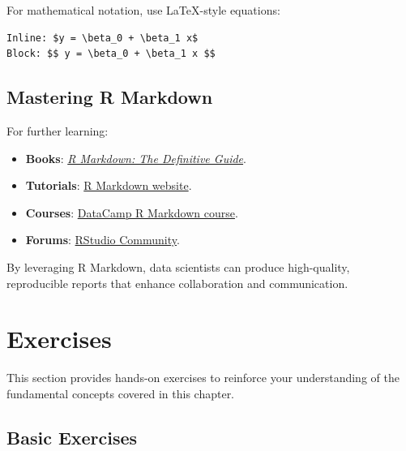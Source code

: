 \documentclass[
  11pt,
]{book}
\providecommand{\tightlist}{%
  \setlength{\itemsep}{0pt}\setlength{\parskip}{0pt}}
\theoremstyle{definition}
\theoremstyle{definition}
\theoremstyle{definition}
\theoremstyle{definition}
\theoremstyle{remark}
\begin{document}
For mathematical notation, use LaTeX-style equations:

\begin{lstlisting}
Inline: $y = \beta_0 + \beta_1 x$  
Block: $$ y = \beta_0 + \beta_1 x $$
\end{lstlisting}

\subsection*{Mastering R Markdown}\label{mastering-r-markdown}


For further learning:

\begin{itemize}
\tightlist
\item
  \textbf{Books}: \href{https://bookdown.org/yihui/rmarkdown/}{\emph{R Markdown: The Definitive Guide}}.\\
\item
  \textbf{Tutorials}: \href{https://rmarkdown.rstudio.com/lesson-1.html}{R Markdown website}.\\
\item
  \textbf{Courses}: \href{https://www.datacamp.com/courses/reporting-with-r-markdown}{DataCamp R Markdown course}.\\
\item
  \textbf{Forums}: \href{https://community.rstudio.com/c/rmarkdown/9}{RStudio Community}.
\end{itemize}

By leveraging R Markdown, data scientists can produce high-quality, reproducible reports that enhance collaboration and communication.

\section{Exercises}\label{intro-R-exercises}

This section provides hands-on exercises to reinforce your understanding of the fundamental concepts covered in this chapter.

\subsection*{Basic Exercises}\label{basic-exercises}
\end{document}
